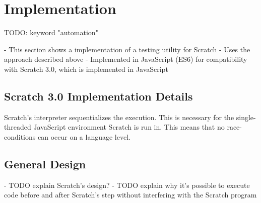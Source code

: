 



\chapter{Implementation}

TODO: keyword "automation"

- This section shows a implementation of a testing utility for Scratch
- Uses the approach described above
- Implemented in JavaScript (ES6) for compatibility with Scratch 3.0, which is implemented in JavaScript

\section {Scratch 3.0 Implementation Details}

Scratch's interpreter sequentializes the execution.
This is necessary for the single-threaded JavaScript environment Scratch is run in.
This means that no race-conditions can occur on a language level.

\section{General Design}

- TODO explain Scratch's design?
- TODO explain why it's possible to execute code before and after Scratch's step without interfering with the Scratch program


